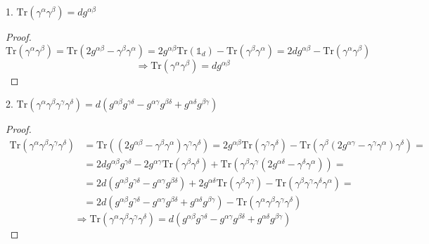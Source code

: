 1. $\mathrm{Tr} \left( \gamma^{\alpha} \gamma^{\beta} \right) = dg^{\alpha\beta}$
\begin{proof}
\begin{equation*}
\mathrm{Tr} \left( \gamma^{\alpha} \gamma^{\beta} \right) = \mathrm{Tr} \left( 2 g^{\alpha\beta} - \gamma^{\beta}\gamma^{\alpha} \right) = 2g^{\alpha\beta} \mathrm{Tr} \left( \mathds{1}_d \right) - \mathrm{Tr} \left( \gamma^{\beta} \gamma^{\alpha} \right) = 2dg^{\alpha\beta} - \mathrm{Tr} \left( \gamma^{\alpha} \gamma^{\beta} \right)
\end{equation*}
\begin{equation*}
\Rightarrow \mathrm{Tr} \left( \gamma^{\alpha} \gamma^{\beta} \right) = dg^{\alpha\beta}
\end{equation*}
\end{proof}

2. $\mathrm{Tr} \left( \gamma^{\alpha}\gamma^{\beta}\gamma^{\gamma}\gamma^{\delta} \right) = d \left( g^{\alpha\beta}g^{\gamma\delta} - g^{\alpha\gamma}g^{\beta\delta} + g^{\alpha\delta}g^{\beta\gamma} \right)$
\begin{proof}
\begin{align*}
\mathrm{Tr} \left( \gamma^{\alpha}\gamma^{\beta}\gamma^{\gamma}\gamma^{\delta} \right) & = \mathrm{Tr} \left( \left( 2g^{\alpha\beta} - \gamma^{\beta}\gamma^{\alpha} \right) \gamma^{\gamma} \gamma^{\delta} \right) = 2g^{\alpha\beta} \mathrm{Tr} \left( \gamma^{\gamma}\gamma^{\delta}\right) - \mathrm{Tr} \left( \gamma^{\beta} \left( 2g^{\alpha\gamma} - \gamma^{\gamma} \gamma^{\alpha} \right) \gamma^{\delta} \right) = & \\
& = 2d g^{\alpha\beta} g^{\gamma\delta} - 2g^{\alpha\gamma} \mathrm{Tr} \left( \gamma^{\beta}\gamma^{\delta} \right) + \mathrm{Tr} \left( \gamma^{\beta} \gamma^{\gamma} \left( 2g^{\alpha\delta} - \gamma^{\delta}\gamma^{\alpha} \right) \right) = & \\
& = 2d \left( g^{\alpha\beta} g^{\gamma\delta} - g^{\alpha\gamma} g^{\beta\delta} \right) + 2g^{\alpha\delta} \mathrm{Tr} \left( \gamma^{\beta}\gamma^{\gamma} \right) - \mathrm{Tr} \left( \gamma^{\beta}\gamma^{\gamma}\gamma^{\delta}\gamma^{\alpha} \right) = & \\
& = 2d \left( g^{\alpha\beta} g^{\gamma\delta} - g^{\alpha\gamma}g^{\beta\delta} + g^{\alpha\delta} g^{\beta\gamma} \right) - \mathrm{Tr} \left( \gamma^{\alpha}\gamma^{\beta}\gamma^{\gamma}\gamma^{\delta} \right) & 
\end{align*}
\begin{equation*}
\Rightarrow \mathrm{Tr} \left( \gamma^{\alpha}\gamma^{\beta}\gamma^{\gamma}\gamma^{\delta} \right) = d \left( g^{\alpha\beta}g^{\gamma\delta} - g^{\alpha\gamma}g^{\beta\delta} + g^{\alpha\delta}g^{\beta\gamma} \right)
\end{equation*}
\end{proof}

